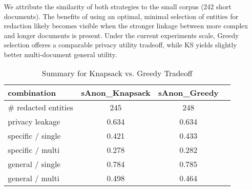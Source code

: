 We attribute the similarity of both strategies to the small corpus (242 short documents). The benefits of using an optimal, minimal selection of entities for redaction likely becomes visible when the stronger linkage between more complex and longer documents is present. Under the current experiments scale, Greedy selection offeres a comparable privacy utility tradeoff, while KS yields slightly better multi-document general utility. 

\begin{table}[h!]
\centering
\caption{Summary for Knapsack vs. Greedy Tradeoff}

\label{discussion-tab:greedy_ks_llmjudge}
\begin{tabular}{l c c c}
\toprule
\textbf{combination} & \textbf{sAnon\_Knapsack} & \textbf{sAnon\_Greedy}\\
\midrule
\# redacted entities & 245 & 248\\
\midrule
privacy leakage & 0.634 &0.634  \\
\midrule
specific / single & 0.421 & 0.433  \\
specific / multi & 0.278 & 0.282  \\
general / single & 0.784 & 0.785  \\
general / multi & 0.498 & 0.464 \\

\bottomrule
\end{tabular}
\end{table}



